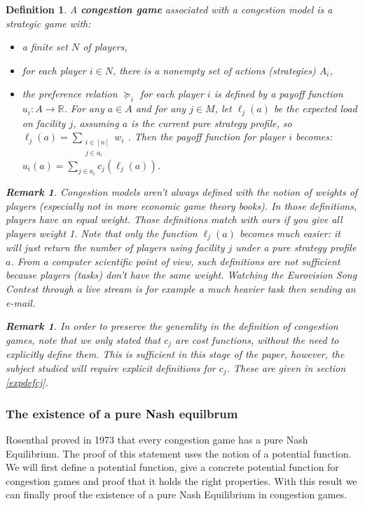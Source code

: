 \documentclass[a4paper,11pt]{article}
\newtheorem{definition}[theorem]{Definition}
\newtheorem{remark}[theorem]{Remark}
\newcommand{\R}{{\mathbb R}}
\begin{document}
\begin{definition}\cite{2,4}
A \textbf{congestion game} associated with a congestion model is a strategic game with:
\begin{itemize}
  \item a finite set $N$ of players,
  \item for each player $i \in N$, there is a nonempty set of actions (strategies) $A_i$,
  \item the preference relation $\succeq_i$ for each player $i$ is defined by a payoff function $u_i: A \rightarrow \R$. For any $a \in A$ and for any $j \in M$, let $\ell_j(a)$ be \emph{the expected load on facility} $j$, assuming $a$ is the current pure strategy profile, so $\ell_j(a) = \sum_{\substack{i \in [n]\\j \in a_i}}{w_i}$ . Then the payoff function for player $i$ becomes: $u_i(a) = \sum_{j\in a_i} c_j(\ell_j(a))$.


\end{itemize}
\begin{remark}
Congestion models aren't always defined with the notion of weights of players (especially not in more economic game theory books). In those definitions, players have an equal weight. Those definitions match with ours if you give all players weight 1. Note that only the function $\ell_j(a)$ becomes much easier: it will just return the number of players using facility $j$ under a pure strategy profile $a$. From a computer scientific point of view, such definitions are not sufficient because players (\emph{tasks}) don't have the same weight. Watching the Eurovision Song Contest through a live stream is for example a much heavier task then sending an e-mail.
\end{remark}
\begin{remark}\label{defcj}
In order to preserve the generality in the definition of congestion games, note that we only stated that $c_j$ are cost functions, without the need to explicitly define them. This is sufficient in this stage of the paper, however, the subject studied will require explicit definitions for $c_j$. These are given in section \ref{expdefcj}.
\end{remark}
\end{definition}
\subsubsection{The existence of a pure Nash equilbrum}
Rosenthal proved in 1973 that every congestion game has a pure Nash Equilibrium. The proof of this statement uses the notion of a potential function. We will first define a potential function, give a concrete potential function for congestion games and proof that it holds the right properties. With this result we can finally proof the existence of a pure Nash Equilibrium in congestion games.
\end{document}

